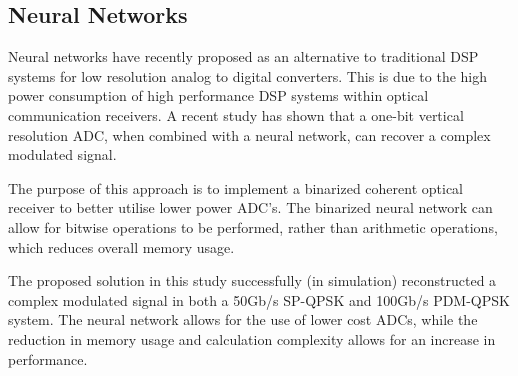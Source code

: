 \subsection{Neural Networks}

Neural networks have recently proposed as an alternative to traditional DSP
systems for low resolution analog to digital converters. This is due to the high
power consumption of high performance DSP systems within optical communication
receivers. A recent study has shown that a one-bit vertical resolution ADC, when
combined with a neural network, can recover a complex modulated
signal\cite{nn_2020}.

\par The purpose of this approach is to implement a binarized coherent optical
receiver to better utilise lower power ADC's. The binarized neural network can
allow for bitwise operations to be performed, rather than arithmetic operations,
which reduces overall memory usage\cite{nn_2020}.

\par The proposed solution in this study successfully (in simulation)
reconstructed a complex modulated signal in both a 50Gb/s SP-QPSK and 100Gb/s
PDM-QPSK system. The neural network allows for the use of lower cost ADCs, while
the reduction in memory usage and calculation complexity allows for an increase
in performance\cite{nn_2020}.
